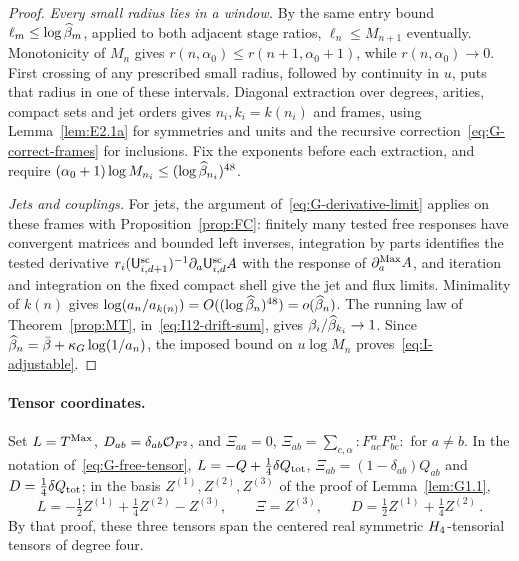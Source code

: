 \begin{proof}
\emph{Every small radius lies in a window.} By the same entry bound $\ell_m\le\log\widehat{\beta}_m$, applied to both adjacent stage ratios, $\ell_n\le M_{n+1}$ eventually. Monotonicity of $M_n$ gives $r(n,\alpha_0)\le r(n+1,\alpha_0+1)$, while $r(n,\alpha_0)\to0$. First crossing of any prescribed small radius, followed by continuity in $u$, puts that radius in one of these intervals. Diagonal extraction over degrees, arities, compact sets and jet orders gives $n_i,k_i=k(n_i)$ and frames, using Lemma~\ref{lem:E2.1a} for symmetries and units and the recursive correction~\eqref{eq:G-correct-frames} for inclusions. Fix the exponents before each extraction, and require $(\alpha_0+1)\log M_{n_i}\le(\log\widehat{\beta}_{n_i})^{48}$.

\emph{Jets and couplings.} For jets, the argument of~\eqref{eq:G-derivative-limit} applies on these frames with Proposition~\ref{prop:FC}: finitely many tested free responses have convergent matrices and bounded left inverses, integration by parts identifies the tested derivative $r_i(\mathsf{U}_{i,d+1}^{\mathrm{sc}})^{-1}\partial_a\mathsf{U}_{i,d}^{\mathrm{sc}}A$ with the response of $\partial_a^{\rm Max}A$, and iteration and integration on the fixed compact shell give the jet and flux limits. Minimality of $k(n)$ gives $\log(a_n/a_{k(n)})=O((\log\widehat{\beta}_n)^{48})=o(\widehat{\beta}_n)$. The running law of Theorem~\ref{prop:MT}, in~\eqref{eq:I12-drift-sum}, gives $\beta_i/\widehat{\beta}_{k_i}\to1$. Since $\widehat{\beta}_n=\bar\beta+\kappa_G\log(1/a_n)$, the imposed bound on $u\log M_n$ proves~\eqref{eq:I-adjustable}.
\end{proof}

\paragraph{Tensor coordinates.}
Set $L=T^{\mathrm{Max}}$, $D_{ab}=\delta_{ab}\mathcal{O}_{F^2}$, and $\Xi_{aa}=0$, $\Xi_{ab}=\sum_{c,\alpha}:F_{ac}^\alpha F_{bc}^\alpha:$ for $a\ne b$. In the notation of~\eqref{eq:G-free-tensor}, $L=-Q+\tfrac14\delta Q_{\rm tot}$, $\Xi_{ab}=(1-\delta_{ab})Q_{ab}$ and $D=\tfrac14\delta Q_{\rm tot}$; in the basis $Z^{(1)},Z^{(2)},Z^{(3)}$ of the proof of Lemma~\ref{lem:G1.1},
\begin{equation*}
L=-\tfrac12Z^{(1)}+\tfrac14Z^{(2)}-Z^{(3)},\qquad\Xi=Z^{(3)},\qquad D=\tfrac12Z^{(1)}+\tfrac14Z^{(2)}\,.
\end{equation*}
By that proof, these three tensors span the centered real symmetric $H_4$-tensorial tensors of degree four.

